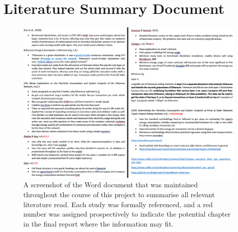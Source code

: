 \chapter{Literature Summary Document}


\begin{figure}[!htb]
    \includegraphics[width=18cm,center]{Figures/PapersSummary.png}
    \caption*{A screenshot of the Word document that was maintained throughout the course of this project to summarise all relevant literature read. Each study was formally referenced, and a red number was assigned prospectively to indicate the potential chapter in the final report where the information may fit.}
    \label{Figure:PapersSummary}
\end{figure}